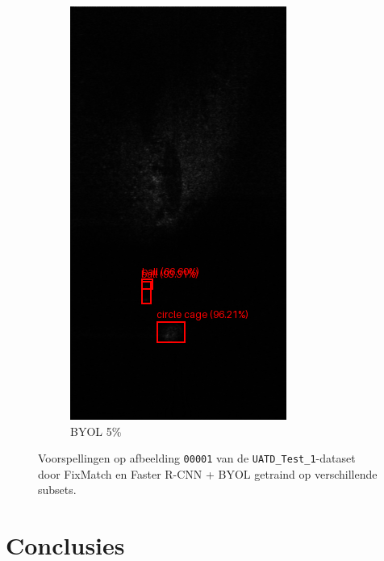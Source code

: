 \documentclass[a0,portrait]{hogent-poster}
\begin{document}
\begin{multicols}{2}
\begin{figure}[H]
\begin{subfigure}{.2\linewidth}
        \includegraphics[width=0.9\linewidth]{1_faster_rcnn_5_byol.png}
        \caption{BYOL 5\%}
    \end{subfigure}%
    \caption{Voorspellingen op afbeelding \texttt{00001} van de \texttt{UATD\_Test\_1}-dataset door FixMatch en Faster R-CNN + BYOL getraind op verschillende subsets.}
\end{figure}

\section{Conclusies}


\end{multicols}
\end{document}

